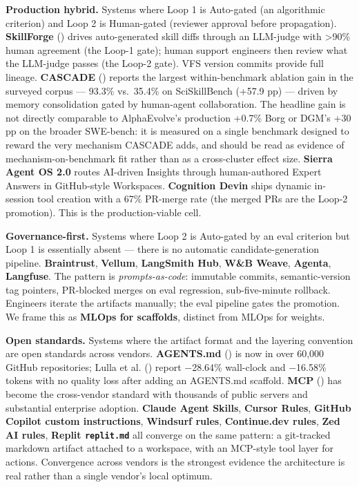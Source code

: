 \documentclass[
]{article}
\begin{document}
\textbf{Production hybrid.} Systems where Loop 1 is Auto-gated (an
algorithmic criterion) and Loop 2 is Human-gated (reviewer approval
before propagation). \textbf{SkillForge}
() drives auto-generated
skill diffs through an LLM-judge with \textgreater90\% human agreement
(the Loop-1 gate); human support engineers then review what the
LLM-judge passes (the Loop-2 gate). VFS version commits provide full
lineage. \textbf{CASCADE} () reports the largest within-benchmark ablation gain in the
surveyed corpus --- 93.3\% vs.~35.4\% on SciSkillBench (+57.9 pp) ---
driven by memory consolidation gated by human-agent collaboration. The
headline gain is not directly comparable to AlphaEvolve's production
+0.7\% Borg or DGM's +30 pp on the broader SWE-bench: it is measured on
a single benchmark designed to reward the very mechanism CASCADE adds,
and should be read as evidence of mechanism-on-benchmark fit rather than
as a cross-cluster effect size. \textbf{Sierra Agent OS 2.0} routes
AI-driven Insights through human-authored Expert Answers in GitHub-style
Workspaces. \textbf{Cognition Devin} ships dynamic in-session tool
creation with a 67\% PR-merge rate (the merged PRs are the Loop-2
promotion). This is the production-viable cell.

\textbf{Governance-first.} Systems where Loop 2 is Auto-gated by an eval
criterion but Loop 1 is essentially absent --- there is no automatic
candidate-generation pipeline. \textbf{Braintrust}, \textbf{Vellum},
\textbf{LangSmith Hub}, \textbf{W\&B Weave}, \textbf{Agenta},
\textbf{Langfuse}. The pattern is \emph{prompts-as-code}: immutable
commits, semantic-version tag pointers, PR-blocked merges on eval
regression, sub-five-minute rollback. Engineers iterate the artifacts
manually; the eval pipeline gates the promotion. We frame this as
\textbf{MLOps for scaffolds}, distinct from MLOps for weights.

\textbf{Open standards.} Systems where the artifact format and the
layering convention are open standards across vendors.
\textbf{AGENTS.md} () is now
in over 60,000 GitHub repositories; {Lulla et al.}
() report −28.64\% wall-clock and
−16.58\% tokens with no quality loss after adding an AGENTS.md scaffold.
\textbf{MCP} () has
become the cross-vendor standard with thousands of public servers and
substantial enterprise adoption. \textbf{Claude Agent Skills},
\textbf{Cursor Rules}, \textbf{GitHub Copilot custom instructions},
\textbf{Windsurf rules}, \textbf{Continue.dev rules}, \textbf{Zed AI
rules}, \textbf{Replit \texttt{replit.md}} all converge on the same
pattern: a git-tracked markdown artifact attached to a workspace, with
an MCP-style tool layer for actions. Convergence across vendors is the
strongest evidence the architecture is real rather than a single
vendor's local optimum.
\end{document}
